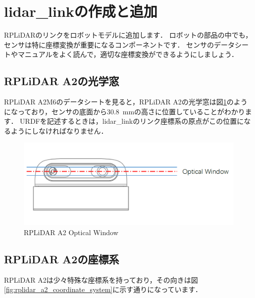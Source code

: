 \documentclass[{../../master}]{subfiles}
\begin{document}
\section{\textsf{lidar\_link}の作成と追加}
\label{sec:add_lidar_link}

RPLiDARのリンクをロボットモデルに追加します．
ロボットの部品の中でも，センサは特に座標変換が重要になるコンポーネントです．
センサのデータシートやマニュアルをよく読んで，適切な座標変換ができるようにしましょう．

\subsection{RPLiDAR A2の光学窓}

RPLiDAR A2M6のデータシートを見ると，RPLiDAR A2の光学窓は図\ref{fig:rplidar_a2_optical_window}のようになっており，センサの底面から\SI{30.8}{mm}の高さに位置していることがわかります．
URDFを記述するときは，\textsf{lidar\_link}のリンク座標系の原点がこの位置になるようにしなければなりません．

\begin{figure}[ht]
  \centering
  \includegraphics[width=100truemm]{images/rplidar_a2_optical_window.png}
  \caption{RPLiDAR A2 Optical Window}
  \label{fig:rplidar_a2_optical_window}
\end{figure}

\subsection{RPLiDAR A2の座標系}

RPLiDAR A2は少々特殊な座標系を持っており，その向きは図\ref{fig:rplidar_a2_coordinate_system}に示す通りになっています．
\end{document}
